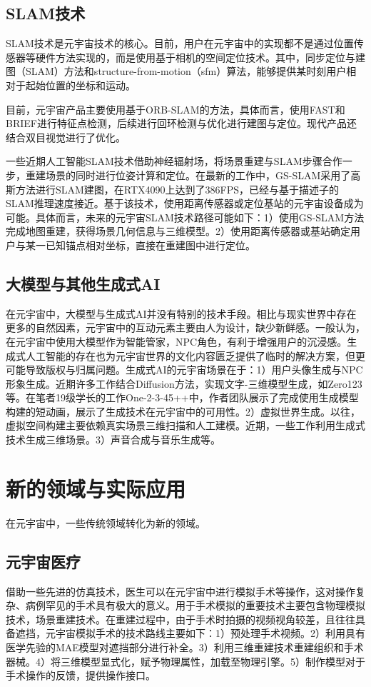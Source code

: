 \documentclass{article}
\begin{document}
	\subsection{SLAM技术}
	SLAM技术是元宇宙技术的核心。目前，用户在元宇宙中的实现都不是通过位置传感器等硬件方法实现的，而是使用基于相机的空间定位技术。其中，同步定位与建图（SLAM）方法和structure-from-motion（sfm）算法，能够提供某时刻用户相对于起始位置的坐标和运动。
	
	目前，元宇宙产品主要使用基于ORB-SLAM\cite{2015orb}的方法\cite{2021all}，具体而言，使用FAST和BRIEF进行特征点检测，后续进行回环检测与优化进行建图与定位。现代产品还结合双目视觉进行了优化。
	
	一些近期人工智能SLAM技术\cite{imap, niceslam}借助神经辐射场，将场景重建与SLAM步骤合作一步，重建场景的同时进行位姿计算和定位。在最新的工作中，GS-SLAM\cite{gsslam}采用了高斯方法进行SLAM建图，在RTX4090上达到了386FPS，已经与基于描述子的SLAM推理速度接近。基于该技术，使用距离传感器或定位基站的元宇宙设备成为可能。具体而言，未来的元宇宙SLAM技术路径可能如下：1）使用GS-SLAM方法完成地图重建，获得场景几何信息与三维模型。2）使用距离传感器或基站确定用户与某一已知锚点相对坐标，直接在重建图中进行定位。
	
	\subsection{大模型与其他生成式AI}
	在元宇宙中，大模型与生成式AI并没有特别的技术手段。相比与现实世界中存在更多的自然因素，元宇宙中的互动元素主要由人为设计，缺少新鲜感。一般认为\cite{2022ai}，在元宇宙中使用大模型作为智能管家，NPC角色，有利于增强用户的沉浸感。生成式人工智能的存在也为元宇宙世界的文化内容匮乏提供了临时的解决方案，但更可能导致版权与归属问题。生成式AI的元宇宙场景在于：1）用户头像生成与NPC形象生成。近期许多工作结合Diffusion方法，实现文字-三维模型生成，如Zero123\cite{0123}等。在笔者19级学长的工作One-2-3-45++\cite{12345++}中，作者团队展示了完成使用生成模型构建的短动画，展示了生成技术在元宇宙中的可用性。2）虚拟世界生成。以往，虚拟空间构建主要依赖真实场景三维扫描和人工建模。近期，一些工作利用生成式技术生成三维场景。3）声音合成与音乐生成等\cite{2023gen}。
	
	\section{新的领域与实际应用}
	在元宇宙中，一些传统领域转化为新的领域。
	\subsection{元宇宙医疗}
	借助一些先进的仿真技术，医生可以在元宇宙中进行模拟手术等操作\cite{rs1, rs2}，这对操作复杂、病例罕见的手术具有极大的意义。用于手术模拟的重要技术主要包含物理模拟技术，场景重建技术。在重建过程中，由于手术时拍摄的视频视角较差，且往往具备遮挡，元宇宙模拟手术的技术路线主要如下：1）预处理手术视频。2）利用具有医学先验的MAE模型对遮挡部分进行补全。3）利用三维重建技术重建组织和手术器械。4）将三维模型显式化，赋予物理属性，加载至物理引擎。5）制作模型对于手术操作的反馈，提供操作接口。
	
\end{document}

